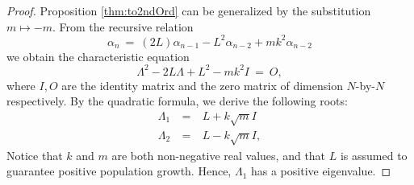 \documentclass[11pt,reqno]{amsart}
\numberwithin{equation}{section}
\theoremstyle{plain}
\begin{document}
\begin{proof}
    Proposition \ref{thm:to2ndOrd} can be generalized by the substitution $m \mapsto -m$. From the recursive relation 
    \begin{equation}
        \alpha_n \ = \ (2L)\alpha_{n - 1} -L^2 \alpha_{n - 2} + mk^2 \alpha_{n - 2}
    \end{equation}
    we obtain the characteristic equation 
    \begin{equation}
    \Lambda ^2 - 2L \Lambda + L^2 - mk^2 I \ =\ O,
    \end{equation}
    where $I, O$ are the identity matrix and the zero matrix of dimension $N$-by-$N$ respectively. 
    By the quadratic formula, we derive the following roots:
    \begin{eqnarray}
        \Lambda_1  & \ = \ & L + k\sqrt{m} I 
        \nonumber \\
        \Lambda_2 & \ = \ & L - k\sqrt{m} I,
    \end{eqnarray}
    Notice that $k$ and $m$ are both non-negative real values, and that $L$ is assumed to guarantee positive population growth. Hence, 
    $\Lambda_1$ has a positive eigenvalue. 


\end{proof}
\end{document}
